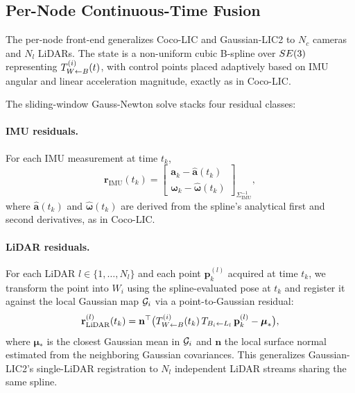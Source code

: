 \subsection{Per-Node Continuous-Time Fusion}
\label{sec:ctfusion}

The per-node front-end generalizes Coco-LIC \cite{lang2023coco} and
Gaussian-LIC2 \cite{lang2026gaussian2} to $N_c$ cameras and $N_l$ LiDARs. The
state is a non-uniform cubic B-spline over $SE(3)$ representing $T_{W\leftarrow B}^{(i)}(t)$,
with control points placed adaptively based on IMU angular and linear
acceleration magnitude, exactly as in Coco-LIC.

The sliding-window Gauss-Newton solve stacks four residual classes:

\paragraph{IMU residuals.} For each IMU measurement at time $t_k$,
\begin{equation}
  \mathbf{r}_{\text{IMU}}(t_k) =
  \begin{bmatrix}
    \mathbf{a}_k - \hat{\mathbf{a}}(t_k) \\
    \boldsymbol{\omega}_k - \hat{\boldsymbol{\omega}}(t_k)
  \end{bmatrix}_{\Sigma_{\text{IMU}}^{-1}},
\end{equation}
where $\hat{\mathbf{a}}(t_k)$ and $\hat{\boldsymbol{\omega}}(t_k)$ are derived
from the spline's analytical first and second derivatives, as in Coco-LIC.

\paragraph{LiDAR residuals.} For each LiDAR $l \in \{1,\dots,N_l\}$ and each
point $\mathbf{p}_k^{(l)}$ acquired at time $t_k$, we transform the point into
$W_i$ using the spline-evaluated pose at $t_k$ and register it against the
local Gaussian map $\mathcal{G}_i$ via a point-to-Gaussian residual:
\begin{equation}
  \mathbf{r}_{\text{LiDAR}}^{(l)}(t_k) =
    \mathbf{n}^\top \bigl( T_{W\leftarrow B}^{(i)}(t_k)\, T_{B_i \leftarrow L_l}\, \mathbf{p}_k^{(l)} - \boldsymbol{\mu}_* \bigr),
\end{equation}
where $\boldsymbol{\mu}_*$ is the closest Gaussian mean in $\mathcal{G}_i$
and $\mathbf{n}$ the local surface normal estimated from the neighboring
Gaussian covariances. This generalizes Gaussian-LIC2's single-LiDAR
registration to $N_l$ independent LiDAR streams sharing the same spline.

